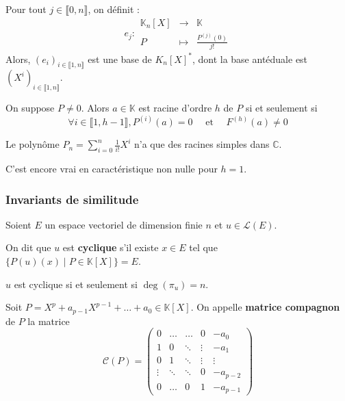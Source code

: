   \begin{application}
    Pour tout $j \in \llbracket 0, n \rrbracket$, on définit :
    \[
    e_j : \begin{array}{ccc}
      \mathbb{K}_n[X] &\rightarrow& \mathbb{K} \\
      P &\mapsto& \frac{P^{(j)}(0)}{j!}
    \end{array}
    \]
    Alors, $(e_i)_{i \in \llbracket 1, n \rrbracket}$ est une base de $K_n[X]^*$, dont la base antéduale est $(X^i)_{i \in \llbracket 1, n \rrbracket}$.
  \end{application}


  \begin{corollary}
    On suppose $P \neq 0$. Alors $a \in \mathbb{K}$ est racine d'ordre $h$ de $P$ si et seulement si
    \[ \forall i \in \llbracket 1, h-1 \rrbracket, P^{(i)}(a) = 0 \quad \text{ et } \quad F^{(h)}(a) \neq 0 \]
  \end{corollary}

  \begin{example}
    Le polynôme $P_n = \sum_{i=0}^{n} \frac{1}{i!} X^{i}$ n'a que des racines simples dans $\mathbb{C}$.
  \end{example}

  \begin{remark}
    C'est encore vrai en caractéristique non nulle pour $h = 1$.
  \end{remark}

  \subsubsection{Invariants de similitude}


  Soient $E$ un espace vectoriel de dimension finie $n$ et $u \in \mathcal{L}(E)$.

  \begin{definition}
    On dit que $u$ est \textbf{cyclique} s'il existe $x \in E$ tel que $\{ P(u)(x) \mid P \in \mathbb{K}[X] \} = E$.
  \end{definition}

  \begin{proposition}
    $u$ est cyclique si et seulement si $\deg(\pi_u) = n$.
  \end{proposition}

  \begin{definition}
    Soit $P = X^p + a_{p-1} X^{p-1} + \dots + a_0 \in \mathbb{K}[X]$. On appelle \textbf{matrice compagnon} de $P$ la matrice
    \[ \mathcal{C}(P) = \begin{pmatrix} 0 & \dots & \dots & 0 & -a_0 \\ 1 & 0 & \ddots & \vdots & -a_1 \\ 0 & 1 & \ddots & \vdots & \vdots \\ \vdots & \ddots & \ddots & 0 & -a_{p-2} \\ 0 & \dots & 0 & 1 & -a_{p-1} \end{pmatrix} \]
  \end{definition}

